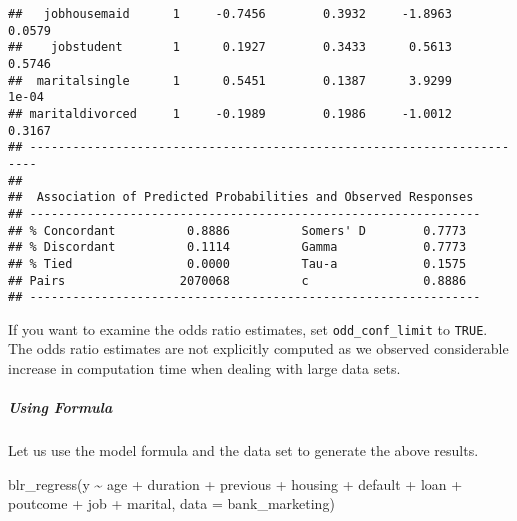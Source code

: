 \documentclass[
]{article}
\newenvironment{Shaded}{\begin{snugshade}}{\end{snugshade}}
\newcommand{\AttributeTok}[1]{\textcolor[rgb]{0.77,0.63,0.00}{#1}}
\newcommand{\FunctionTok}[1]{\textcolor[rgb]{0.00,0.00,0.00}{#1}}
\newcommand{\NormalTok}[1]{#1}
\newcommand{\SpecialCharTok}[1]{\textcolor[rgb]{0.00,0.00,0.00}{#1}}
\begin{document}
\begin{verbatim}
##   jobhousemaid      1     -0.7456        0.3932     -1.8963      0.0579 
##    jobstudent       1      0.1927        0.3433      0.5613      0.5746 
##  maritalsingle      1      0.5451        0.1387      3.9299       1e-04 
## maritaldivorced     1     -0.1989        0.1986     -1.0012      0.3167 
## -----------------------------------------------------------------------
## 
##  Association of Predicted Probabilities and Observed Responses  
## ---------------------------------------------------------------
## % Concordant          0.8886          Somers' D        0.7773   
## % Discordant          0.1114          Gamma            0.7773   
## % Tied                0.0000          Tau-a            0.1575   
## Pairs                2070068          c                0.8886   
## ---------------------------------------------------------------
\end{verbatim}

If you want to examine the odds ratio estimates, set
\texttt{odd\_conf\_limit} to \texttt{TRUE}. The odds ratio estimates are
not explicitly computed as we observed considerable increase in
computation time when dealing with large data sets.

\hypertarget{using-formula}{%
\subparagraph{Using Formula}\label{using-formula}}

Let us use the model formula and the data set to generate the above
results.

\begin{Shaded}
\begin{Highlighting}[]
\FunctionTok{blr\_regress}\NormalTok{(y }\SpecialCharTok{\textasciitilde{}}\NormalTok{  age }\SpecialCharTok{+}\NormalTok{ duration }\SpecialCharTok{+}\NormalTok{ previous }\SpecialCharTok{+}\NormalTok{ housing }\SpecialCharTok{+}\NormalTok{ default }\SpecialCharTok{+}
\NormalTok{             loan }\SpecialCharTok{+}\NormalTok{ poutcome }\SpecialCharTok{+}\NormalTok{ job }\SpecialCharTok{+}\NormalTok{ marital, }\AttributeTok{data =}\NormalTok{ bank\_marketing)}
\end{Highlighting}
\end{Shaded}
\end{document}
